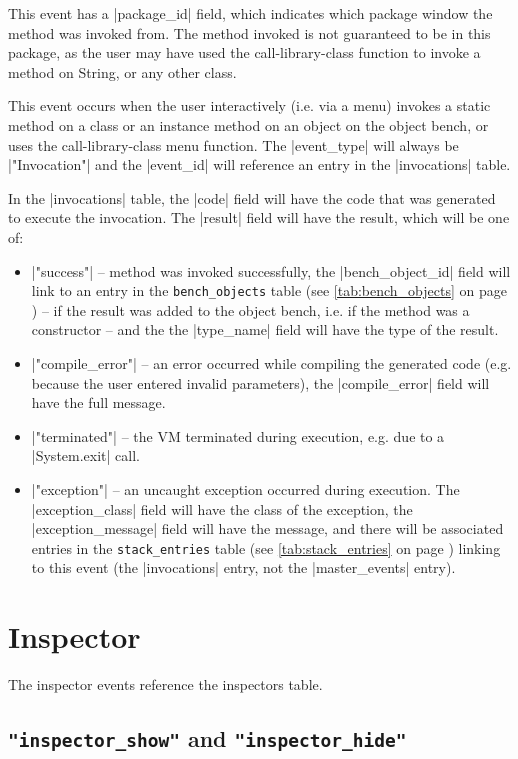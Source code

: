 \documentclass{report}
\newcommand{\myref}[1]{\autoref{#1} on page \pageref*{#1}}
\newcommand{\tabref}[1]{\lstinline|#1| table (see \myref{tab:#1})}
\begin{document}
This event has a |package_id| field, which indicates which package window the
method was invoked from.  The method invoked is not guaranteed to be in this
package, as the user may have used the call-library-class function to invoke a
method on String, or any other class.

This event occurs when the user interactively (i.e. via a menu) invokes a
static method on a class or an instance method on an object on the object
bench, or uses the call-library-class menu function.  The |event_type| will
always be |"Invocation"| and the |event_id| will reference an entry in the
|invocations| table.  

In the |invocations| table, the |code| field will have the code that was generated
to execute the invocation.  The |result| field will have the result, which will be one of:

\begin{itemize}
\item |"success"| -- method was invoked successfully, the |bench_object_id|
  field will link to an entry in the \tabref{bench_objects} -- if the result was added to the
  object bench, i.e. if the method was a constructor -- and the the |type_name|
  field will have the type of the result.
\item |"compile_error"| -- an error occurred while compiling the generated code
  (e.g. because the user entered invalid parameters), the |compile_error|
  field will have the full message.
\item |"terminated"| -- the VM terminated during execution, e.g. due to a
  |System.exit| call.
\item |"exception"| -- an uncaught exception occurred during execution.  The
  |exception_class| field will have the class of the exception, the
  |exception_message| field will have the message, and there will be
  associated entries in the \tabref{stack_entries} linking to this event (the
  |invocations| entry, not the |master_events| entry).
\end{itemize}

\section{Inspector}

The inspector events reference the inspectors table.


\subsection{\lstinline!"inspector_show"! and \lstinline!"inspector_hide"!}
\end{document}
